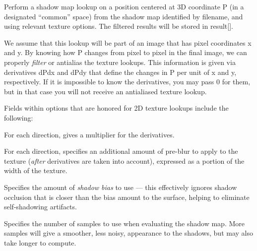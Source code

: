 
Perform a shadow map lookup on a position centered at 3D
coordinate {\cf P} (in a designated ``common'' space) from the shadow map identified by
{\cf filename}, and using relevant texture {\cf options}.  The filtered
results will be stored in {\cf result[]}.

We assume that this lookup will be part of an image that has pixel
coordinates {\cf x} and {\cf y}.  By knowing how {\cf P} changes from
pixel to pixel in the final image, we can properly \emph{filter} or
antialias the texture lookups.  This information is given via
derivatives {\cf dPdx} and {\cf dPdy} that define the changes in {\cf P}
per unit of {\cf x} and {\cf y}, respectively.  If it is impossible to
know the derivatives, you may pass 0 for them, but in that case you will
not receive an antialiased texture lookup.

Fields within {\cf options} that are honored for 2D texture lookups
include the following:

\vspace{-24pt}
\vspace{10pt}
For each direction, gives a multiplier for the derivatives.
\apiend

\vspace{-24pt}
\vspace{10pt}
For each direction, specifies an additional amount of pre-blur to apply
to the texture (\emph{after} derivatives are taken into account),
expressed as a portion of the width of the texture.
\apiend

\vspace{-24pt}
\vspace{10pt}
Specifies the amount of \emph{shadow bias} to use --- this effectively
ignores shadow occlusion that is closer than the bias amount to the
surface, helping to eliminate self-shadowing artifacts.
\apiend

\vspace{-24pt}
\vspace{10pt}
Specifies the number of samples to use when evaluating the shadow map.
More samples will give a smoother, less noisy, appearance to the
shadows, but may also take longer to compute.
\apiend


